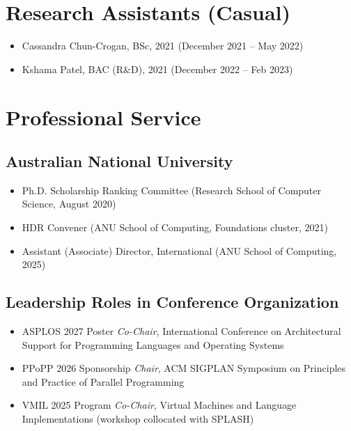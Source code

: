 \documentclass[11pt,a4paper,sans]{moderncv}
\begin{document}
\section{Research Assistants (Casual)}
{\small
\begin{itemize}
\item Cassandra Chun-Crogan, BSc, 2021 (December 2021 -- May 2022)
\item Kshama Patel, BAC (R\&D), 2021 (December 2022 -- Feb 2023)
\end{itemize}
}

\section{Professional Service}
\subsection{Australian National University}
\begin{itemize}
\item Ph.D. Scholarship Ranking Committee (Research School of Computer Science, August 2020)
\item HDR Convener (ANU School of Computing, Foundations cluster, 2021)
\item Assistant (Associate) Director, International (ANU School of Computing, 2025)
\end{itemize}

\subsection{Leadership Roles in Conference Organization}
{\small
\begin{itemize}
\item ASPLOS 2027 Poster \textit{Co-Chair}, International Conference on Architectural Support for Programming Languages and Operating Systems
\item PPoPP 2026 Sponsorship \textit{Chair}, ACM SIGPLAN Symposium on Principles and Practice of Parallel Programming 
\item VMIL 2025 Program \textit{Co-Chair}, Virtual Machines and Language Implementations (workshop collocated with SPLASH)
\end{itemize}
}
\end{document}
